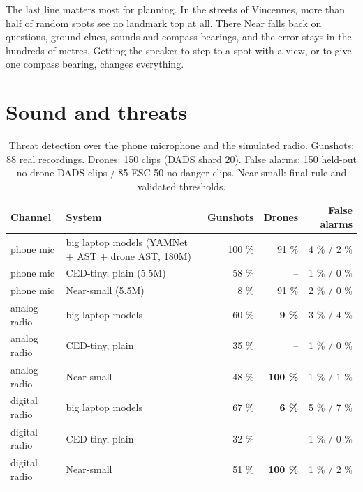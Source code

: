 The last line matters most for planning. In the streets of Vincennes, more than half of random spots see no landmark
top at all. There Near falls back on questions, ground clues, sounds and compass bearings, and the error stays in the
hundreds of metres. Getting the speaker to step to a spot with a view, or to give one compass bearing, changes everything.

\section{Sound and threats}

\begin{table}[htbp]\centering\small
\caption{Threat detection over the phone microphone and the simulated radio. Gunshots: 88 real recordings. Drones: 150
clips (DADS shard 20). False alarms: 150 held-out no-drone DADS clips / 85 ESC-50 no-danger clips. Near-small: final
rule and validated thresholds.}\label{tab:radioeval}
\begin{tabular}{llrrr}
\toprule
Channel & System & Gunshots & Drones & False alarms\\
\midrule
phone mic & big laptop models (YAMNet + AST + drone AST, 180M) & 100 \% & 91 \% & 4 \% / 2 \%\\
phone mic & CED-tiny, plain (5.5M) & 58 \% & -- & 1 \% / 0 \%\\
phone mic & Near-small (5.5M) & 8 \% & 91 \% & 2 \% / 0 \%\\
\midrule
analog radio & big laptop models & 60 \% & \textbf{9 \%} & 3 \% / 4 \%\\
analog radio & CED-tiny, plain & 35 \% & -- & 1 \% / 0 \%\\
analog radio & Near-small & 48 \% & \textbf{100 \%} & 1 \% / 1 \%\\
\midrule
digital radio & big laptop models & 67 \% & \textbf{6 \%} & 5 \% / 7 \%\\
digital radio & CED-tiny, plain & 32 \% & -- & 1 \% / 0 \%\\
digital radio & Near-small & 51 \% & \textbf{100 \%} & 1 \% / 2 \%\\
\bottomrule
\end{tabular}
\end{table}

